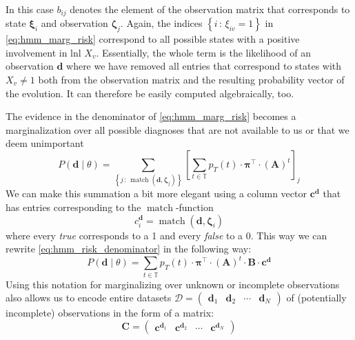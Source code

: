 \documentclass[../ms.tex]{subfiles}
\begin{document}
%
In this case $b_{ij}$ denotes the element of the observation matrix that corresponds to state $\boldsymbol{\xi}_i$ and observation $\boldsymbol{\zeta}_j$. Again, the indices $\left\{ i \,:\, \xi_{iv} = 1 \right\}$ in \cref{eq:hmm_marg_risk} correspond to all possible states with a positive involvement in \acrlong{lnl} $X_v$. Essentially, the whole term is the likelihood of an observation $\mathbf{d}$ where we have removed all entries that correspond to states with $X_v \neq 1$ both from the observation matrix and the resulting probability vector of the evolution. It can therefore be easily computed algebraically, too.

The evidence in the denominator of \cref{eq:hmm_marg_risk} becomes a marginalization over all possible diagnoses that are not available to us or that we deem unimportant
%
\begin{equation} \label{eq:hmm_risk_denominator}
    P \left( \mathbf{d} \mid \theta \right) = \sum_{\left\{ j \,:\, \operatorname{match}(\mathbf{d}, \boldsymbol{\zeta}_j) \right\}}{\left[ \sum_{t \in \mathbb{T}}{p_T(t) \cdot \boldsymbol{\pi}^\top \cdot (\mathbf{A})^t} \right]_j}
\end{equation}
%
We can make this summation a bit more elegant using a column vector $\mathbf{c}^{\mathbf{d}}$ that has entries corresponding to the $\operatorname{match}$-function
%
\begin{equation}
    c_i^{\mathbf{d}} = \operatorname{match}(\mathbf{d}, \boldsymbol{\zeta}_i)
\end{equation}
%
where every \emph{true} corresponds to a 1 and every \emph{false} to a 0. This way we can rewrite \cref{eq:hmm_risk_denominator} in the following way:
%
\begin{equation}
    P \left( \mathbf{d} \mid \theta \right) = \sum_{t \in \mathbb{T}}{p_T(t) \cdot \boldsymbol{\pi}^\top \cdot (\mathbf{A})^t} \cdot \mathbf{B} \cdot \mathbf{c}^{\mathbf{d}}
\end{equation}
%
Using this notation for marginalizing over unknown or incomplete observations also allows us to encode entire datasets $\boldsymbol{\mathcal{D}} = \begin{pmatrix} \mathbf{d}_1 & \mathbf{d}_2 & \cdots & \mathbf{d}_N \end{pmatrix}$ of (potentially incomplete) observations in the form of a matrix:
%
\begin{equation}
    \mathbf{C} = 
    \begin{pmatrix} \mathbf{c}^{\mathbf{d}_1} & \mathbf{c}^{\mathbf{d}_2} & \cdots & \mathbf{c}^{\mathbf{d}_N} \end{pmatrix}
\end{equation}
%
\end{document}
